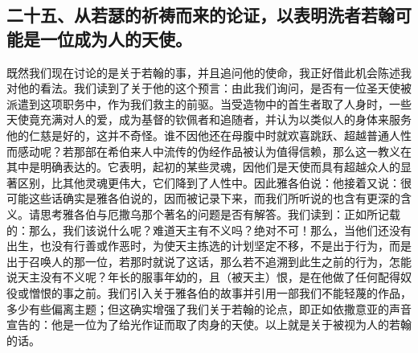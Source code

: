 
\subsection{二十五、从若瑟的祈祷而来的论证，以表明洗者若翰可能是一位成为人的天使。}

既然我们现在讨论的是关于若翰的事，并且追问他的使命，我正好借此机会陈述我对他的看法。我们读到了关于他的这个预言：由此我们询问，是否有一位圣天使被派遣到这项职务中，作为我们救主的前驱。当受造物中的首生者取了人身时，一些天使竟充满对人的爱，成为基督的钦佩者和追随者，并认为以类似人的身体来服务他的仁慈是好的，这并不奇怪。谁不因他还在母腹中时就欢喜跳跃、超越普通人性而感动呢？若那部在希伯来人中流传的伪经作品被认为值得信赖，那么这一教义在其中是明确表达的。它表明，起初的某些灵魂，因他们是天使而具有超越众人的显著区别，比其他灵魂更伟大，它们降到了人性中。因此雅各伯说：他接着又说：很可能这些话确实是雅各伯说的，因而被记录下来，而我们所听说的也含有更深的含义。请思考雅各伯与厄撒乌那个著名的问题是否有解答。我们读到：正如所记载的：那么，我们该说什么呢？难道天主有不义吗？绝对不可！那么，当他们还没有出生，也没有行善或作恶时，为使天主拣选的计划坚定不移，不是出于行为，而是出于召唤人的那一位，若那时就说了这话，那么若不追溯到此生之前的行为，怎能说天主没有不义呢？年长的服事年幼的，且（被天主）恨，是在他做了任何配得奴役或憎恨的事之前。我们引入关于雅各伯的故事并引用一部我们不能轻蔑的作品，多少有些偏离主题；但这确实增强了我们关于若翰的论点，即正如依撒意亚的声音宣告的：他是一位为了给光作证而取了肉身的天使。以上就是关于被视为人的若翰的话。\par

